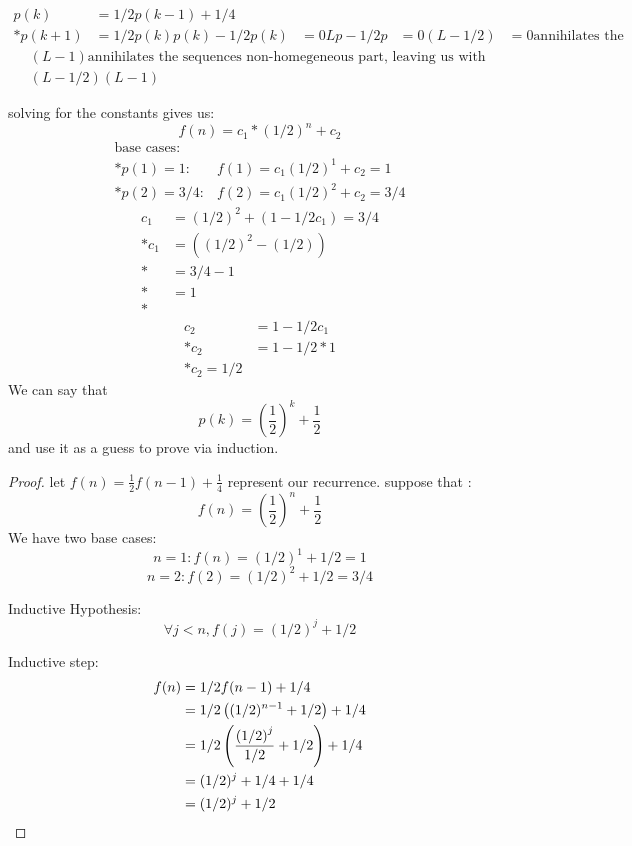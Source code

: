 \documentclass[titlepage]{article}
\theoremstyle{definition}
\begin{document}
    \begin{align}
      p(k) & = 1/2 p(k -1) + 1/4 \\*
      p(k+1) & = 1/2 p(k)
      p(k) - 1/2 p(k) & =  0 
      Lp - 1/2 p & = 0
      \left( L - 1/2 \right) & = 0 \text{annihilates the sequences homegeneous
      part}
    \end{align}
    \begin{align}
      \left(L - 1\right) \text{annihilates the sequences non-homegeneous
      part, leaving us with }\\
      \left( L - 1/2 \right) \left(L - 1\right)
    \end{align}

    solving for the constants gives us:
    \[ f(n) = c_1 * (1/2)^n + c_2 \]
    \begin{align}
      \text{base cases}: \\*
      p(1) = 1: & f(1) = c_1 (1/2)^1 + c_2 = 1  \\*
      p(2) = 3/4: & f(2) = c_1 (1/2)^2 + c_2 = 3/4
    \end{align}
    \begin{align}
      c_1 &= (1/2)^2 + (1 - 1/2 c_1) = 3/4 \\*
      c_1 &= \left( (1/2)^2 - (1/2)\right) \\*
          &= 3/4 - 1 \\*
          &= 1 \\*
    \end{align}
    \begin{align}
      c_2 &= 1 - 1/2 c_1 \\*
      c_2 &= 1 - 1/2 * 1 \\*
      c_2 = 1/2
    \end{align}
  We can say that 
  \[ p(k) = \left(\frac{1}{2}\right)^k + \frac{1}{2} \]
  and use it as a guess to prove via induction.
  \begin{proof}
      let $f(n) = \frac{1}{2} f(n-1) + \frac{1}{4}$ represent our recurrence. 
      suppose that :
    \[ f(n) = \left(\frac{1}{2}\right)^n + \frac{1}{2} \]
    We have two base cases:
    \[ n =1: f(n) = (1/2)^1 + 1/2 = 1 \]
    \[ n = 2: f(2) = (1/2)^2 + 1/2 = 3/4 \]

    Inductive Hypothesis:
    \[ \forall j < n, f(j) = (1/2)^j + 1/2 \]

    Inductive step:
    \begin{align}
      f(n) &= 1/2 f(n-1) + 1/4 \\*
      &= 1/2\left( (1/2)^{n-1} + 1/2 \right) + 1/4 \\*
      &= 1/2 \left( \frac{\left(1/2\right)^j}{1/2} + 1/2 \right) + 1/4 \\*
      &= (1/2)^j + 1/4 + 1/4 \\*
      &= (1/2)^j + 1/2 \qedhere
    \end{align}
  \end{proof}
\end{document}

